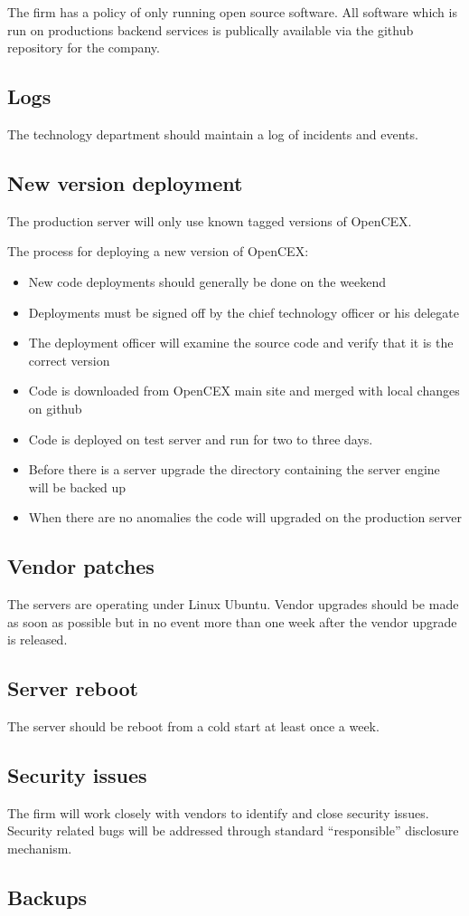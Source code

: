 The firm has a policy of only running open source software.  All
software which is run on productions backend services is publically
available via the github repository for the company.

\subsection{Logs}
The technology department should maintain a log of incidents and
events.  

\subsection{New version deployment}
The production server will only use known tagged versions of OpenCEX.

The process for deploying a new version of OpenCEX:
\begin{itemize}
  \item New code deployments should generally be done on the weekend
  \item Deployments must be signed off by the chief technology officer
    or his delegate
  \item The deployment officer will examine the source code and verify
    that it is the correct version
  \item Code is downloaded from OpenCEX main site and merged with
    local changes on github
  \item Code is deployed on test server and run for two to three days.
  \item Before there is a server upgrade the directory containing the
    server engine will be backed up
  \item When there are no anomalies the code will upgraded on the
    production server
\end{itemize}
    
\subsection{Vendor patches}
The servers are operating under Linux Ubuntu.  Vendor upgrades should
be made as soon as possible but in no event more than one week after
the vendor upgrade is released.

\subsection{Server reboot}
The server should be reboot from a cold start at least once a week.

\subsection{Security issues}
The firm will work closely with vendors to identify and close security
issues.  Security related bugs will be addressed through standard
``responsible'' disclosure mechanism.

\subsection{Backups}


